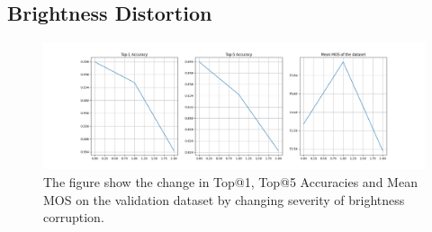 \documentclass[10pt,twocolumn,letterpaper]{article}
\begin{document}
\subsection{Brightness Distortion}
\begin{figure}[!ht]
	\centering
	\includegraphics[width=1.\columnwidth]{Images/brightness.png}
	\caption{The figure show the change in Top@1, Top@5 Accuracies and Mean MOS on the validation dataset by changing severity of brightness corruption.}
\end{figure}
\end{document}
